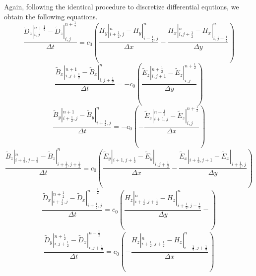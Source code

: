 Again, following the identical procedure to discretize differential equtions, we obtain the following equations.
\begin{displaymath}
  \frac{\widetilde{D}_z|_{i,j}^{n+\frac{1}{2}}-\widetilde{D}_z|_{i,j}^{n+\frac{1}{2}}}{\Delta t} =
  c_0 \left(\frac{H_y|_{i+\frac{1}{2},j}^{n} - H_y|_{i-\frac{1}{2},j}^n}{\Delta x} - \frac{H_x|_{i,j+\frac{1}{2}}^{n} - H_x|_{i,j-\frac{1}{2}}^{n}}{\Delta y}\right)
\end{displaymath}
\begin{displaymath}
  \frac{\widetilde{B}_x|_{i,j+\frac{1}{2}}^{n+1} - \widetilde{B}_x|_{i,j+\frac{1}{2}}^{n}}{\Delta t} = 
  - c_0\left(\frac{\widetilde{E}_z|_{i,j+1}^{n+\frac{1}{2}} - \widetilde{E}_z|_{i,j}^{n+\frac{1}{2}}}{\Delta y}\right)
\end{displaymath}
\begin{displaymath}
  \frac{\widetilde{B}_y|_{i+\frac{1}{2},j}^{n+1} - \widetilde{B}_y|_{i+\frac{1}{2},j}^{n}}{\Delta t} =
  - c_0\left( - \frac{\widetilde{E}_z|_{i+1,j}^{n+\frac{1}{2}} - \widetilde{E}_z|_{i,j}^{n+\frac{1}{2}}}{\Delta x}\right)
\end{displaymath}
\begin{displaymath}
  \frac{\widetilde{B}_z|_{i+\frac{1}{2},j+\frac{1}{2}}^{n} - \widetilde{B}_z|_{i+\frac{1}{2},j+\frac{1}{2}}^{n}}{\Delta t} =
  c_0\left(\frac{\widetilde{E}_y|_{i+1,j+\frac{1}{2}}^{} - \widetilde{E}_y|_{i,j+\frac{1}{2}}^{}}{\Delta x} - \frac{\widetilde{E}_x|_{i+\frac{1}{2},j+1}^{} - \widetilde{E}_x|_{i+\frac{1}{2},j}^{}}{\Delta y}\right)
\end{displaymath}
\begin{displaymath}
  \frac{\widetilde{D}_x|_{i+\frac{1}{2},j}^{n+\frac{1}{2}} - \widetilde{D}_x|_{i+\frac{1}{2},j}^{n-\frac{1}{2}}}{\Delta t} =
  c_0\left(\frac{H_z|_{i+\frac{1}{2},j+\frac{1}{2}}^{n} - H_z|_{i+\frac{1}{2},j-\frac{1}{2}}^{n}}{\Delta y} - \right)
\end{displaymath}
\begin{displaymath}
  \frac{\widetilde{D}_y|_{i,j+\frac{1}{2}}^{n+\frac{1}{2}} - \widetilde{D}_x|_{i,j+\frac{1}{2}}^{n-\frac{1}{2}}}{\Delta t} =
  c_0\left( - \frac{H_z|_{i+\frac{1}{2},j+\frac{1}{2}}^{n} - H_z|_{i-\frac{1}{2},j+\frac{1}{2}}^{n}}{\Delta x}\right)
\end{displaymath}


